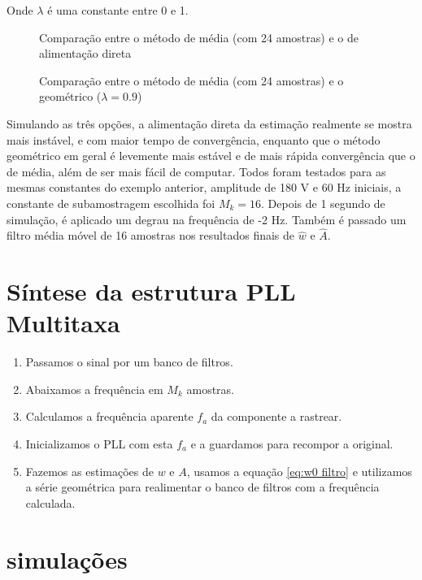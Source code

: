 Onde $\lambda$ é uma constante entre 0 e 1. \\

\begin{figure}[h]
	\centering    
	\def\svgscale{1}
	
	\caption{Comparação entre o método de média (com 24 amostras) e o de alimentação direta}
	\label{fig:esquema_pll}
\end{figure}

\begin{figure}[h]
	\centering    
	\def\svgscale{1}
	
	\caption{Comparação entre o método de média (com 24 amostras) e o geométrico ($\lambda=0.9$)}
	\label{fig:esquema_pll}
\end{figure}

\indent Simulando as três opções, a alimentação direta da estimação realmente se mostra mais instável, e com maior tempo de convergência, enquanto que o método geométrico em geral é levemente mais estável e de mais rápida convergência que o de média, além de ser mais fácil de computar. Todos foram testados para as mesmas constantes do exemplo anterior, amplitude de 180 V e 60 Hz iniciais, a constante de subamostragem escolhida foi $M_k=16$. Depois de 1 segundo de simulação, é aplicado um degrau na frequência de -2 Hz. Também é passado um filtro média móvel de 16 amostras nos resultados finais de $\hat{w}$ e $\hat{A}$.

\section{Síntese da estrutura PLL Multitaxa}

\begin{enumerate}
	\item Passamos o sinal por um banco de filtros.
	\item Abaixamos a frequência em $M_k$ amostras.
	\item Calculamos a frequência aparente $f_a$ da componente a rastrear.
	\item Inicializamos o PLL com esta $f_a$ e a guardamos para recompor a original.
	\item Fazemos as estimações de $w$ e $A$, usamos a equação \ref{eq:w0 filtro} e utilizamos a série geométrica para realimentar o banco de filtros com a frequência calculada.
\end{enumerate}

\section{simulações}

